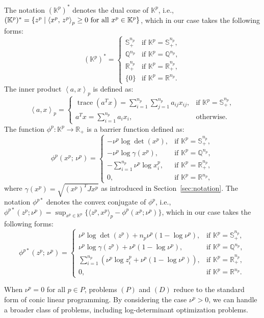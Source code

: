 %
The notation $(\mathbb{K}^p)^*$ denotes the dual cone of $\mathbb{K}^p$, 
i.e., $(\mathbb{K}^p)^* = \{ z^p \mid \left\langle x^p, \, z^p \right\rangle_p \geq 0 \text{ for all } x^p \in \mathbb{K}^p \}$, 
which in our case takes the following forms:
\[
(\mathbb{K}^p)^* = 
\begin{cases}
    \mathbb{S}_{+}^{n_p} & \text{if } \mathbb{K}^{p} = \mathbb{S}_{+}^{n_p},\\
    \mathbb{Q}^{n_p}     & \text{if } \mathbb{K}^{p} = \mathbb{Q}^{n_p},\\
    \mathbb{R}_{+}^{n_p} & \text{if } \mathbb{K}^{p} = \mathbb{R}_{+}^{n_p},\\
    \{0\}                & \text{if } \mathbb{K}^{p} = \mathbb{R}^{n_p}.
\end{cases}
\]
%
The inner product $\left\langle a, x \right\rangle_p$ is defined as:
\[
\left\langle a, x \right\rangle_p = 
\begin{cases}
    \operatorname{trace}(a^T x) 
    = \sum_{i=1}^{n_p} \sum_{j=1}^{n_p} a_{ij} x_{ij}, 
    & \text{if } \mathbb{K}^p = \mathbb{S}_{+}^{n_p},\\[6pt]
    a^T x = \sum_{i=1}^{n_p} a_i x_i, 
    & \text{otherwise}.
\end{cases}
\]
%
The function $\phi^p : \mathbb{K}^p \to \mathbb{R}_+$ is a barrier function defined as:
\[
\phi^p(x^p;\, \nu^p) =
\begin{cases}
    -\nu^p \log \det(x^p), & \text{if } \mathbb{K}^{p} = \mathbb{S}_{+}^{n_p},\\
    -\nu^p \log \gamma(x^p), & \text{if } \mathbb{K}^{p} = \mathbb{Q}^{n_p},\\
    -\sum_{i=1}^{n_p} \nu^p \log x^p_i, & \text{if } \mathbb{K}^{p} = \mathbb{R}_{+}^{n_p},\\
    0, & \text{if } \mathbb{K}^{p} = \mathbb{R}^{n_p},
\end{cases}
\]
where $\gamma(x^p) = \sqrt{(x^p)^T J x^p}$ as introduced in Section~\ref{sec:notation}.
%
The notation $\phi^{p*}$ denotes the convex conjugate of $\phi^p$, 
i.e., $\phi^{p*}(z^p; \nu^p) = \sup_{x^p \in \mathbb{K}^p} \{\langle z^p, x^p \rangle_p - \phi^p(x^p; \nu^p)\}$, 
which in our case takes the following forms:
\[
\phi^{p*}(z^p;\, \nu^p) =
\begin{cases}
    \nu^p \log \det(z^p) + n_p \nu^p (1 - \log \nu^p), 
    & \text{if } \mathbb{K}^{p} = \mathbb{S}_{+}^{n_p},\\[4pt]
    \nu^p \log \gamma(z^p) + \nu^p (1 - \log \nu^p), 
    & \text{if } \mathbb{K}^{p} = \mathbb{Q}^{n_p},\\[4pt]
    \sum_{i=1}^{n_p} \left( \nu^p \log z^p_i + \nu^p (1 - \log \nu^p) \right), 
    & \text{if } \mathbb{K}^{p} = \mathbb{R}_{+}^{n_p},\\[3pt]
    0, & \text{if } \mathbb{K}^{p} = \mathbb{R}^{n_p}.
\end{cases}
\]

When $\nu^p = 0$ for all $p \in P$, problems $(P)$ and $(D)$ reduce to the standard form of conic linear programming.
By considering the case $\nu^p > 0$, we can handle a broader class of problems, including log-determinant optimization problems.